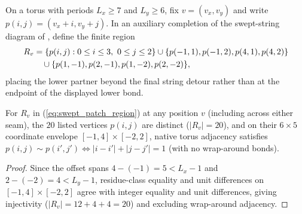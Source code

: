 \begin{definition}
    \label{def:peps_torus_swept_patch_endpoint_geometry}
    \leanok
    On a torus with periods $L_x\ge 7$ and $L_y\ge 6$, fix $v=(v_x,v_y)$ and write $p(i,j)=(v_x+i,v_y+j)$.
    In an auxiliary completion of the swept-string diagram of \cite[fluxon-braiding passage]{Schuch2010PEPS}, define the finite region
    \begin{align}
        R_v & = \{p(i,j) : 0\le i\le 3,\ 0\le j\le 2\} \cup \{p(-1,1),p(-1,2),p(4,1),p(4,2)\} \notag \\
            & \quad \cup \{p(1,-1),p(2,-1),p(1,-2),p(2,-2)\}, \label{eq:swept_patch_region}
    \end{align}
    placing the lower partner beyond the final string detour rather than at the endpoint of the displayed lower bond.
\end{definition}

\begin{lemma}
    \label{thm:peps_torus_swept_patch_endpoint_geometry}
    \leanok
    For $R_v$ in (\ref{eq:swept_patch_region}) at any position $v$ (including across either seam), the $20$ listed vertices $p(i,j)$ are distinct ($|R_v|=20$), and on their $6\times 5$ coordinate envelope $[-1,4]\times[-2,2]$, native torus adjacency satisfies $p(i,j)\sim p(i',j')\iff |i-i'|+|j-j'|=1$ (with no wrap-around bonds).
\end{lemma}
\begin{proof}\leanok
    Since the offset spans $4-(-1)=5<L_x-1$ and $2-(-2)=4<L_y-1$, residue-class equality and unit differences on $[-1,4]\times[-2,2]$ agree with integer equality and unit differences, giving injectivity ($|R_v|=12+4+4=20$) and excluding wrap-around adjacency.
\end{proof}


